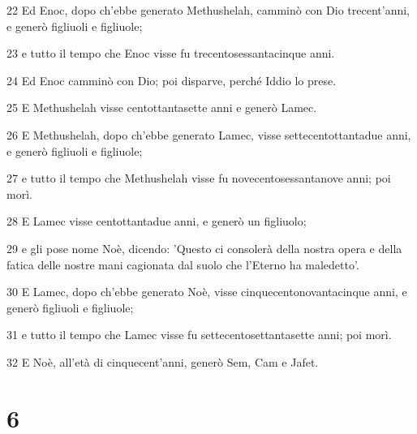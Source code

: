 \par 22 Ed Enoc, dopo ch'ebbe generato Methushelah, camminò con Dio trecent'anni, e generò figliuoli e figliuole;
\par 23 e tutto il tempo che Enoc visse fu trecentosessantacinque anni.
\par 24 Ed Enoc camminò con Dio; poi disparve, perché Iddio lo prese.
\par 25 E Methushelah visse centottantasette anni e generò Lamec.
\par 26 E Methushelah, dopo ch'ebbe generato Lamec, visse settecentottantadue anni, e generò figliuoli e figliuole;
\par 27 e tutto il tempo che Methushelah visse fu novecentosessantanove anni; poi morì.
\par 28 E Lamec visse centottantadue anni, e generò un figliuolo;
\par 29 e gli pose nome Noè, dicendo: 'Questo ci consolerà della nostra opera e della fatica delle nostre mani cagionata dal suolo che l'Eterno ha maledetto'.
\par 30 E Lamec, dopo ch'ebbe generato Noè, visse cinquecentonovantacinque anni, e generò figliuoli e figliuole;
\par 31 e tutto il tempo che Lamec visse fu settecentosettantasette anni; poi morì.
\par 32 E Noè, all'età di cinquecent'anni, generò Sem, Cam e Jafet.

\chapter{6}

